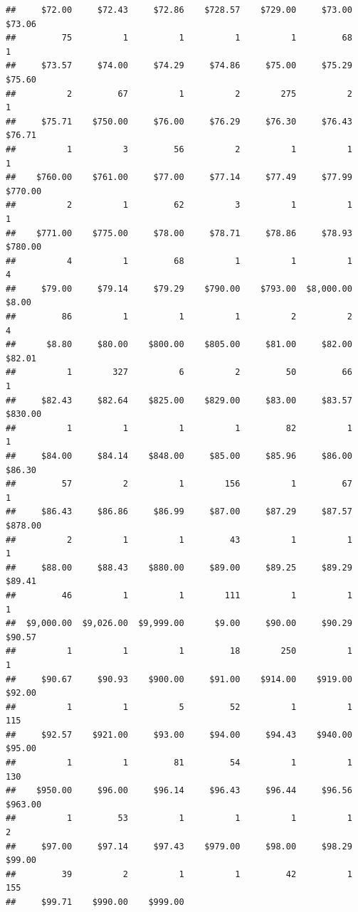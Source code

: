 \begin{verbatim}
##     $72.00     $72.43     $72.86    $728.57    $729.00     $73.00     $73.06 
##         75          1          1          1          1         68          1 
##     $73.57     $74.00     $74.29     $74.86     $75.00     $75.29     $75.60 
##          2         67          1          2        275          2          1 
##     $75.71    $750.00     $76.00     $76.29     $76.30     $76.43     $76.71 
##          1          3         56          2          1          1          1 
##    $760.00    $761.00     $77.00     $77.14     $77.49     $77.99    $770.00 
##          2          1         62          3          1          1          1 
##    $771.00    $775.00     $78.00     $78.71     $78.86     $78.93    $780.00 
##          4          1         68          1          1          1          4 
##     $79.00     $79.14     $79.29    $790.00    $793.00  $8,000.00      $8.00 
##         86          1          1          1          2          2          4 
##      $8.80     $80.00    $800.00    $805.00     $81.00     $82.00     $82.01 
##          1        327          6          2         50         66          1 
##     $82.43     $82.64    $825.00    $829.00     $83.00     $83.57    $830.00 
##          1          1          1          1         82          1          1 
##     $84.00     $84.14    $848.00     $85.00     $85.96     $86.00     $86.30 
##         57          2          1        156          1         67          1 
##     $86.43     $86.86     $86.99     $87.00     $87.29     $87.57    $878.00 
##          2          1          1         43          1          1          1 
##     $88.00     $88.43    $880.00     $89.00     $89.25     $89.29     $89.41 
##         46          1          1        111          1          1          1 
##  $9,000.00  $9,026.00  $9,999.00      $9.00     $90.00     $90.29     $90.57 
##          1          1          1         18        250          1          1 
##     $90.67     $90.93    $900.00     $91.00    $914.00    $919.00     $92.00 
##          1          1          5         52          1          1        115 
##     $92.57    $921.00     $93.00     $94.00     $94.43    $940.00     $95.00 
##          1          1         81         54          1          1        130 
##    $950.00     $96.00     $96.14     $96.43     $96.44     $96.56    $963.00 
##          1         53          1          1          1          1          2 
##     $97.00     $97.14     $97.43    $979.00     $98.00     $98.29     $99.00 
##         39          2          1          1         42          1        155 
##     $99.71    $990.00    $999.00 

\end{verbatim}

